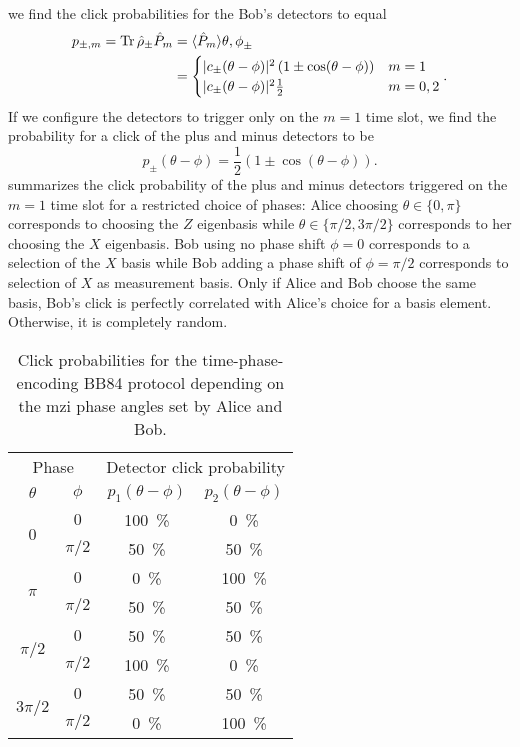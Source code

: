 we find the click probabilities for the Bob's detectors to equal
\begin{equation}
	\begin{split}
		p_{\pm,m}
		=
		\operatorname{Tr}{\hat\rho_\pm\hat{P}_m}
		&=
		\langle\hat{P}_m\rangle{\theta,\phi}_{\pm}
		\\
		&=
		\begin{cases}
			\lvert c_\pm(\theta-\phi)\rvert^2\left(1\pm\cos(\theta-\phi)\right) & m=1 \\
			\lvert c_\pm(\theta-\phi)\rvert^2\frac{1}{2} & m=0,2
		\end{cases}
		.
	\end{split}
\end{equation}
If we configure the detectors to trigger only on the $m=1$ time slot, we find the probability for a click of the plus and minus detectors to be
\begin{equation}
	p_\pm(\theta-\phi)
	=
	\frac{1}{2}
	\left(1\pm\cos(\theta-\phi)\right)
	.
\end{equation}
 summarizes the click probability of the plus and minus detectors triggered on the $m=1$ time slot for a restricted choice of phases:
Alice choosing $\theta\in\{0,\pi\}$ corresponds to choosing the $Z$ eigenbasis while $\theta\in\{\pi/2,3\pi/2\}$ corresponds to her choosing the $X$ eigenbasis. Bob using no phase shift $\phi=0$ corresponds to a selection of the $X$ basis while Bob adding a phase shift of $\phi=\pi/2$ corresponds to selection of $X$ as measurement basis. Only if Alice and Bob choose the same basis, Bob's click is perfectly correlated with Alice's choice for a basis element. Otherwise, it is completely random.
\begin{table}[htb]
	\centering
	\begin{tabular}{cccc}
		\toprule
		\multicolumn{2}{c}{Phase} & \multicolumn{2}{c}{Detector click probability} \\
		\cmidrule{1-2}
		\cmidrule{3-4}
		$\theta$ & $\phi$ & $p_1(\theta-\phi)$ & $p_2(\theta-\phi)$ \\
		\midrule
		\multirow{2}{*}{$0$} & $0$ & \SI{100}{\percent} & \SI{0}{\percent} \\
		& $\pi/2$ & \SI{50}{\percent} & \SI{50}{\percent} \\
		\cmidrule{1-2}
		\multirow{2}{*}{$\pi$} & $0$ & \SI{0}{\percent} & \SI{100}{\percent} \\
		& $\pi/2$ & \SI{50}{\percent} & \SI{50}{\percent} \\
		\cmidrule{1-2}
		\multirow{2}{*}{$\pi/2$} & $0$ & \SI{50}{\percent} & \SI{50}{\percent} \\
		& $\pi/2$ & \SI{100}{\percent} & \SI{0}{\percent} \\
		\cmidrule{1-2}
		\multirow{2}{*}{$3\pi/2$} & $0$ & \SI{50}{\percent} & \SI{50}{\percent} \\
		& $\pi/2$ & \SI{0}{\percent} & \SI{100}{\percent} \\
		\bottomrule
	\end{tabular}
	\caption{Click probabilities for the time-phase-encoding BB84 protocol depending on the \gls{mzi} phase angles set by Alice and Bob.}\label{tab:bb84_time_phase_clicks}
\end{table}
